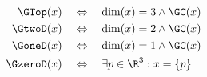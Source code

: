 \begin{satz}
    \begin{align*}
        \GTop(x) \quad &\Leftrightarrow \quad \dim(x) = 3 \land \GC(x) \\
        \GtwoD(x) \quad &\Leftrightarrow \quad \dim(x) = 2 \land \GC(x) \\
        \GoneD(x) \quad &\Leftrightarrow \quad \dim(x) = 1 \land \GC(x) \\
        \GzeroD(x) \quad &\Leftrightarrow \quad \exists p \in \R^3: x = \{p\}
    \end{align*}
\end{satz}
















